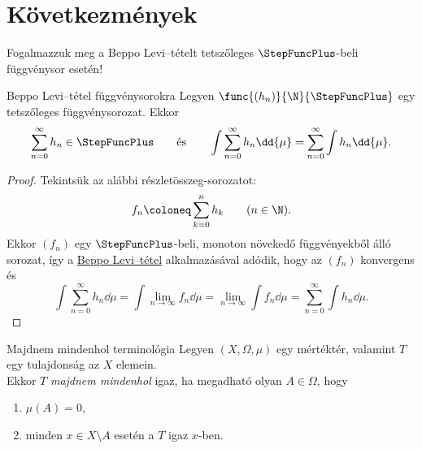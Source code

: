 \documentclass[
]{elteikthesis}[2024/04/26]
\begin{document}
	\noindent 
	
	\newpage
	\section{Következmények}
	
	Fogalmazzuk meg a Beppo Levi--tételt tetszőleges \( \StepFuncPlus \)-beli függvénysor esetén!
	
	\begin{theorem}{Beppo Levi--tétel függvénysorokra}{}
		Legyen \( \func{(h_n)}{\N}{\StepFuncPlus} \) egy tetszőleges függvénysorozat. Ekkor
		\[
			\sum_{n=0}^{\infty} h_n \in \StepFuncPlus
			\qquad \text{és} \qquad
			\int \sum_{n=0}^{\infty} h_n \dd{\mu} =
			\sum_{n=0}^{\infty} \int h_n \dd{\mu}.
		\]
	\end{theorem}
	\begin{proof}
		Tekintsük az alábbi részletösszeg-sorozatot:
		\[
			f_n \coloneq \sum_{k=0}^{n} h_k \qquad (n \in \N).
		\]
		Ekkor \( (f_n) \) egy \( \StepFuncPlus \)-beli, 
		monoton növekedő függvényekből álló sorozat, 
		így a \hyperref[th:beppo-levi]{Beppo Levi--tétel} alkalmazásával adódik, 
		hogy az \( (f_n) \) konvergens és
		\[
			\int \sum_{n=0}^{\infty} h_n \dd{\mu} =
			\int \lim_{n \to \infty} f_n \dd{\mu} =
			\lim_{n \to \infty} \int f_n \dd{\mu} =
			\sum_{n=0}^{\infty} \int h_n \dd{\mu}.
		\]
	\end{proof}
	
	
	
	\begin{definition}{Majdnem mindenhol terminológia}{}
		Legyen \( (X, \Omega, \mu) \) egy mértéktér, 
		valamint \( T \) egy tulajdonság az \( X \) elemein.\\[3pt]
		Ekkor \( T \) \emph{majdnem mindenhol} igaz, 
		ha megadható olyan \( A \in \Omega \), hogy
		\begin{enumerate}
			\item \( \mu(A) = 0 \),
			\item minden \( x \in X \setminus A \) esetén a \( T \) igaz \( x \)-ben.
		\end{enumerate}
	\end{definition}
	
\end{document}
